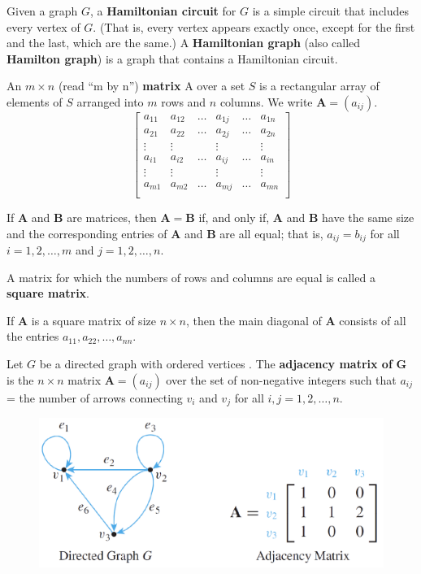 \documentclass{article}
\begin{document}
\begin{description}
    \item[Hamiltonian Circuit and Hamiltonian Graph] Given a graph $G$, a \textbf{Hamiltonian circuit} for $G$ is a simple circuit that includes every vertex of $G$. (That is, every vertex appears exactly once, except for the first and the last, which are the same.) A \textbf{Hamiltonian graph} (also called \textbf{Hamilton graph}) is a graph that contains a
Hamiltonian circuit.
	\item[Matrix]An $m\times n$ (read ``m by n'') \textbf{matrix} A over a set $S$ is a rectangular array of elements of $S$ arranged into $m$ rows and $n$ columns. We write $\mathbf{A}=(a_{ij})$.
	\[
	\begin{bmatrix}
		a_{11} & a_{12} & \dots & a_{1j} & \dots & a_{1n} \\
		a_{21} & a_{22} & \dots & a_{2j} & \dots & a_{2n} \\
		\vdots & \vdots &   \   & \vdots &   \   & \vdots \\
		a_{i1} & a_{i2} & \dots & a_{ij} & \dots & a_{in} \\
		\vdots & \vdots &   \   & \vdots &   \   & \vdots \\
		a_{m1} & a_{m2} & \dots & a_{mj} & \dots & a_{mn} \\
	\end{bmatrix}
	\]
	\item \qquad If \textbf{A} and \textbf{B} are matrices, then $\mathbf{A} = \mathbf{B}$ if, and only if, \textbf{A} and \textbf{B} have the same size and the corresponding entries of \textbf{A} and \textbf{B} are all equal; that is, $a_{ij}=b_{ij}$ for all $i=1,2,\dots,m$ and $j=1,2,\dots,n$.
	\item \qquad A matrix for which the numbers of rows and columns are equal is called a \textbf{square matrix}.
	\item \qquad If \textbf{A} is a square matrix of size $n\times n$, then the main diagonal of \textbf{A} consists of all the entries $a_{11},a_{22},\dots,a_{nn}$.
	
    \item[Adjacency Matrix of a Directed Graph] Let $G$ be a directed graph with ordered vertices . The \textbf{adjacency matrix of} $\mathbf{G}$ is the $n\times n$ matrix $\mathbf{A}=(a_{ij})$ over the set of non-negative integers such that $a_{ij}$ = the number of arrows connecting $v_{i}$ and $v_{j}$ for all $i, j = 1, 2, \dots, n$.
    
		\begin{figure}[H]
			\centering
			\includegraphics[scale=0.5]{adj_matrix}
		\end{figure}
    

\end{description}
\end{document}
